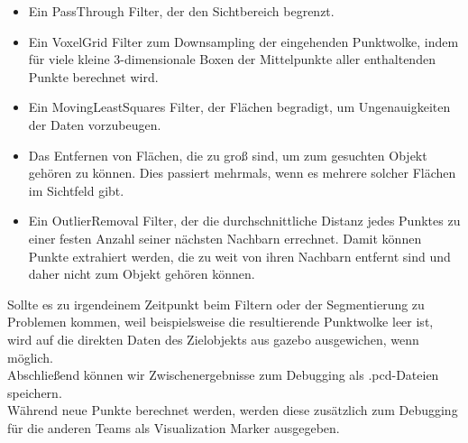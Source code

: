 \documentclass{suturo}
\begin{document}
\begin{itemize} 
\item Ein PassThrough Filter, der den Sichtbereich begrenzt.
\item Ein VoxelGrid Filter zum Downsampling der eingehenden Punktwolke, indem für viele kleine 3-dimensionale Boxen der Mittelpunkte aller enthaltenden Punkte berechnet wird.
\item Ein MovingLeastSquares Filter, der Flächen begradigt, um Ungenauigkeiten der Daten vorzubeugen.
\item Das Entfernen von Flächen, die zu groß sind, um zum gesuchten Objekt gehören zu können. Dies passiert mehrmals, wenn es mehrere solcher Flächen im Sichtfeld gibt.
\item Ein OutlierRemoval Filter, der die durchschnittliche Distanz jedes Punktes zu einer festen Anzahl seiner nächsten Nachbarn errechnet. Damit können Punkte extrahiert werden, die zu weit von ihren Nachbarn entfernt sind und daher nicht zum Objekt gehören können.
\end{itemize}

Sollte es zu irgendeinem Zeitpunkt beim Filtern oder der Segmentierung zu Problemen kommen, weil beispielsweise die resultierende Punktwolke leer ist, wird auf die direkten Daten des Zielobjekts aus gazebo ausgewichen, wenn möglich.
\\
Abschließend können wir Zwischenergebnisse zum Debugging als .pcd-Dateien speichern.
\\
Während neue Punkte berechnet werden, werden diese zusätzlich zum Debugging für die anderen Teams als Visualization Marker ausgegeben.
\end{document}
